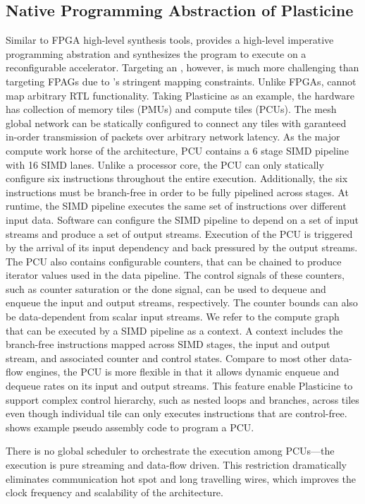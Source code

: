 \subsection{Native Programming Abstraction of Plasticine}
Similar to FPGA high-level synthesis tools, \name provides a high-level imperative programming abstration
and synthesizes the program to execute on a reconfigurable accelerator. Targeting an \rda, however,
is much more challenging than targeting FPAGs due to \rda's stringent mapping constraints. 
Unlike FPGAs, \rdas cannot map arbitrary RTL functionality. 
Taking Plasticine as an example, 
the hardware has collection of memory tiles (PMUs) and compute tiles (PCUs). 
The mesh global network can be statically configured to connect any tiles with garanteed in-order 
transmission of packets over arbitrary network latency.
As the major compute work horse of the architecture, PCU contains a 6 stage SIMD pipeline with 16 SIMD lanes. 
Unlike a processor core, the PCU can only statically configure six instructions throughout the
entire execution.
Additionally, the six instructions must be branch-free in order to be fully pipelined across stages.
At runtime, the SIMD pipeline executes the same set of instructions over different input data.
Software can configure the SIMD pipeline to depend on a set of input streams and
produce a set of output streams. 
Execution of the PCU is triggered by the arrival of its input dependency and  back pressured by
the output streams.
The PCU also contains configurable counters, that can be chained to produce iterator values used in
the data pipeline. The control signals of these counters, such as counter saturation or the done
signal, can be used to dequeue and enqueue the input and output streams, respectively.
The counter bounds can also be data-dependent from scalar input streams.
We refer to the compute graph that can be executed by a SIMD pipeline as a context. A context includes
the branch-free instructions mapped across SIMD stages, the input and output stream, and associated
counter and control states.
Compare to most other data-flow engines, the PCU is more flexible in that it allows dynamic enqueue
and dequeue rates on its input and output streams.
This feature enable Plasticine to support complex control hierarchy, such as nested loops and
branches, across tiles even though individual tile can only executes instructions that are
control-free. \todo{} shows example pseudo assembly code to program a PCU.

There is no global scheduler to orchestrate the execution among PCUs---the execution is pure
streaming and data-flow driven. This restriction dramatically eliminates communication hot spot and
long travelling wires, which improves the clock frequency and scalability of the architecture.

